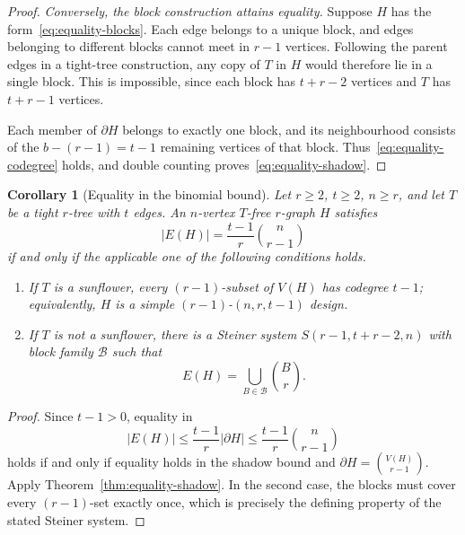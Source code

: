\documentclass[11pt]{article}
\newtheorem{corollary}[theorem]{Corollary}
\theoremstyle{remark}
\numberwithin{equation}{section}
\newcommand{\sh}{\partial}
\begin{document}
\begin{proof}
		\medskip\noindent
		\emph{Conversely, the block construction attains equality.}
		Suppose $H$ has the form~\eqref{eq:equality-blocks}. Each
		edge belongs to a unique block, and edges belonging to
		different blocks cannot meet in $r-1$ vertices. Following
		the parent edges in a tight-tree construction, any copy of
		$T$ in $H$ would therefore lie in a single block. This is
		impossible, since each block has $t+r-2$ vertices and $T$
		has $t+r-1$ vertices.
		
		Each member of $\sh H$ belongs to exactly one block, and
		its neighbourhood consists of the $b-(r-1)=t-1$ remaining
		vertices of that block. Thus~\eqref{eq:equality-codegree}
		holds, and double counting proves~\eqref{eq:equality-shadow}.
	\end{proof}
	
	\begin{corollary}[Equality in the binomial bound]
		\label{cor:equality-binomial}
		Let $r\ge2$, $t\ge2$, $n\ge r$, and let $T$ be a tight
		$r$-tree with $t$ edges. An $n$-vertex $T$-free $r$-graph $H$
		satisfies
		\[
		|E(H)|=\frac{t-1}{r}\binom n{r-1}
		\]
		if and only if the applicable one of the following conditions holds.
		\begin{enumerate}[label=\textup{(\roman*)},leftmargin=*]
			\item If $T$ is a sunflower, every $(r-1)$-subset of $V(H)$
			has codegree $t-1$; equivalently, $H$ is a simple
			$(r-1)$-$(n,r,t-1)$ design.
			\item If $T$ is not a sunflower, there is a Steiner system
			$S(r-1,t+r-2,n)$ with block family $\mathcal B$ such that
			\[
			E(H)=\bigcup_{B\in\mathcal B}\binom Br.
			\]
		\end{enumerate}
	\end{corollary}
	
	\begin{proof}
		Since $t-1>0$, equality in
		\[
		|E(H)|\le\frac{t-1}{r}|\sh H|
		\le\frac{t-1}{r}\binom n{r-1}
		\]
		holds if and only if equality holds in the shadow bound and
		$\sh H=\binom{V(H)}{r-1}$. Apply
		Theorem~\ref{thm:equality-shadow}. In the second case, the
		blocks must cover every $(r-1)$-set exactly once, which is
		precisely the defining property of the stated Steiner system.
	\end{proof}
	
\end{document}
